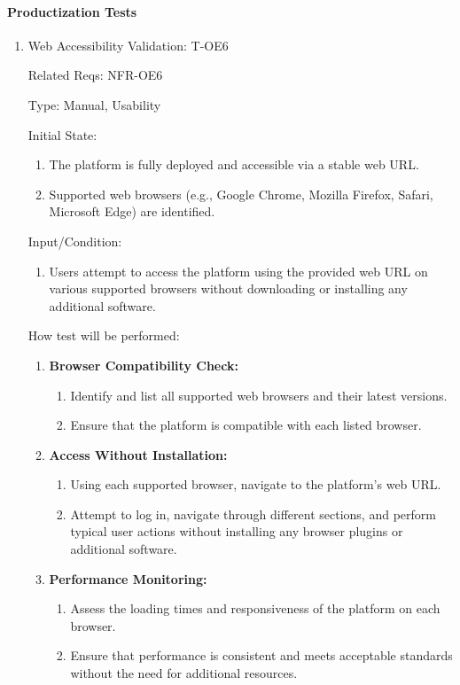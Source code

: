 \documentclass[12pt, titlepage]{article}
\begin{document}
\paragraph{Productization Tests}
\begin{enumerate}

\item{Web Accessibility Validation: T-OE6\\}

Related Reqs: NFR-OE6

Type: Manual, Usability

Initial State:
\begin{enumerate}
    \item The platform is fully deployed and accessible via a stable web URL.
    \item Supported web browsers (e.g., Google Chrome, Mozilla Firefox, Safari, Microsoft Edge) are identified.
\end{enumerate}
Input/Condition:
\begin{enumerate}
    \item Users attempt to access the platform using the provided web URL on various supported browsers without downloading or installing any additional software.
\end{enumerate}
How test will be performed:
\begin{enumerate}
    \item \textbf{Browser Compatibility Check:}
    \begin{enumerate}
        \item Identify and list all supported web browsers and their latest versions.
        \item Ensure that the platform is compatible with each listed browser.
    \end{enumerate}
    
    \item \textbf{Access Without Installation:}
    \begin{enumerate}
        \item Using each supported browser, navigate to the platform’s web URL.
        \item Attempt to log in, navigate through different sections, and perform typical user actions without installing any browser plugins or additional software.
    \end{enumerate}
    
    \item \textbf{Performance Monitoring:}
    \begin{enumerate}
        \item Assess the loading times and responsiveness of the platform on each browser.
        \item Ensure that performance is consistent and meets acceptable standards without the need for additional resources.
    \end{enumerate}
    
\end{enumerate}

\end{enumerate}
\end{document}
